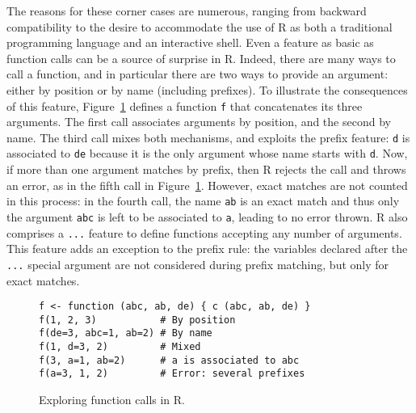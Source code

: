 \documentclass[
    sigplan,
    10pt,
    review, %
    natbib=false %
 ]{acmart}
\newcommand\newtext[1]{{\color{blue} #1}}
\newcommand\changed[1]{{\color{blue} #1}}
\begin{document}
The reasons for these corner cases are numerous, ranging from backward compatibility to the desire to accommodate the use of R as both a traditional programming language and an interactive shell.
Even a feature as basic as function calls can be a source of surprise in R.
Indeed, there are many ways to call a function, and in particular there are two ways to provide an argument: either by position or by name (including prefixes). %
%
\changed{To illustrate the consequences of this feature,}
Figure~\ref{fig:calls} defines a function \texttt{f} that concatenates its three arguments. The first call associates arguments by position, and the second by name. The third call mixes both mechanisms, and exploits the prefix feature: \texttt{d} is associated to \texttt{de}
because it is the only argument whose name starts with \texttt{d}.
Now, if more than one argument matches by prefix,
then R rejects the call and throws an error,
as in the fifth call in Figure~\ref{fig:calls}.
However, exact matches are not counted in this process:
in the fourth call,
the name \texttt{ab} is an exact match
and thus only the argument \texttt{abc}
is left to be associated to \texttt{a},
leading to no error thrown.
%
\newtext{
R also comprises a \texttt{...} feature
to define functions accepting any number of arguments.
This feature adds an exception to the prefix rule:
the variables declared after the \texttt{...} special argument
are not considered during prefix matching,
but only for exact matches.}

\begin{figure}[t]
\begin{verbatim}
f <- function (abc, ab, de) { c (abc, ab, de) }
f(1, 2, 3)           # By position
f(de=3, abc=1, ab=2) # By name
f(1, d=3, 2)         # Mixed
f(3, a=1, ab=2)      # a is associated to abc
f(a=3, 1, 2)         # Error: several prefixes
\end{verbatim}
\vspace{-1em}
\caption{Exploring function calls in R.}
\label{fig:calls}
\end{figure}
\end{document}
